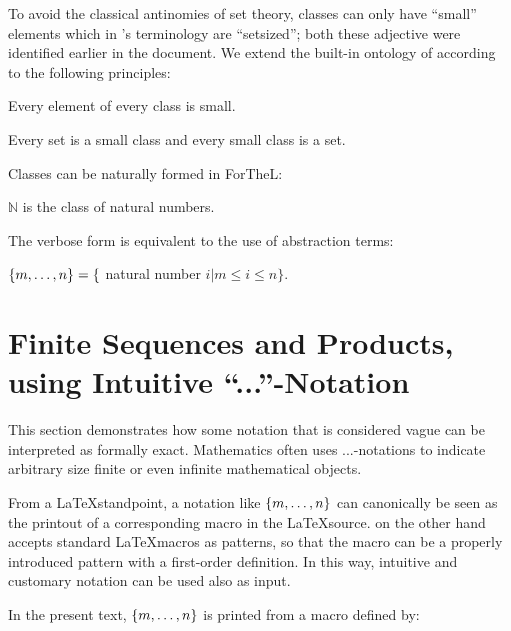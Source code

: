\documentclass[11pt]{article}
\begin{document}
To avoid the classical antinomies of set theory,
classes can only have ``small'' elements
which in \Naproche's terminology are ``setsized'';
both these adjective were identified earlier in the
document.
We extend the built-in ontology of \Naproche
according to the following principles:
\begin{forthel}

\begin{axiom}
Every element of every class is small.
\end{axiom}

\begin{axiom}
Every set is a small class and every small class is a set.
\end{axiom}

\end{forthel}
Classes can be naturally formed in ForTheL:

\begin{forthel}

\begin{definition} $\mathbb{N}$ is the
class of natural numbers.
\end{definition}

\end{forthel}

The verbose form is equivalent to the
use of abstraction terms:

\begin{definition} $\{m,\dots,n\} = \{$ natural number $i |
m \leq i \leq n \}$.
\end{definition}


\section{Finite Sequences and Products, using Intuitive ``...''-Notation}

This section demonstrates how some notation that is
considered vague can be interpreted as formally
exact. Mathematics often uses ...-notations to
indicate arbitrary size finite or even infinite mathematical
objects.

From a \LaTeX standpoint, a notation like
$\{m,\dots,n\}$ can canonically be seen as the printout
of a corresponding macro in the \LaTeX source. \Naproche
on the other hand accepts standard \LaTeX macros as
patterns, so that the macro can be a properly introduced
\Naproche pattern with a first-order definition.
In this way, intuitive and customary notation can be used
also as \Naproche input.

In the present text, $\{m,\dots,n\}$ is printed from
a macro defined by:
\end{document}
